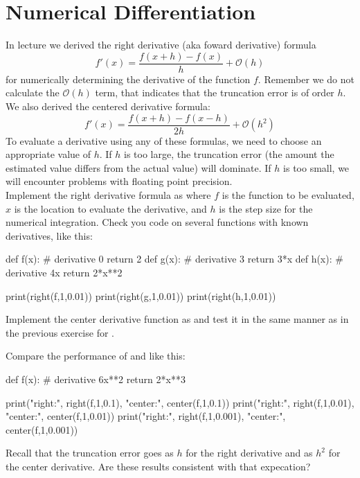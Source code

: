 \section{Numerical Differentiation}

In lecture we derived the right derivative (aka foward derivative) formula
\begin{displaymath}
  f'(x) = \frac{f(x+h) - f(x)}{h} + \mathcal{O}(h)
\end{displaymath}
for numerically determining the derivative of the function $f$.  Remember we do not calculate the 
$\mathcal{O}(h)$ term, that indicates that the truncation error is of order $h$.
We also derived the centered derivative formula:
\begin{displaymath}
f'(x) = \frac{f(x+h) - f(x-h)}{2h} + \mathcal{O}(h^2)
\end{displaymath}
To evaluate a derivative using any of these formulas, we need to
choose an appropriate value of $h$.  If $h$ is too large, the
truncation error (the amount the estimated value differs from the
actual value) will dominate.  If $h$ is too small, we will encounter
problems with floating point precision.\\

\plot Implement the right derivative formula as 
where $f$ is the function to be evaluated, $x$ is the location to
evaluate the derivative, and $h$ is the step size for the numerical
integration.  Check you code on several functions with known
derivatives, like this:
\begin{python}
def f(x):  # derivative 0
    return 2
def g(x):  # derivative 3
    return 3*x
def h(x):  # derivative 4x
    return 2*x**2

print(right(f,1,0.01))
print(right(g,1,0.01))
print(right(h,1,0.01))
\end{python} \vskip 0.25cm


\plot Implement the center derivative function as  and test it in the same manner as in the previous exercise for .\\

\newpage

\plot Compare the performance of  and  like this:
\begin{python}
def f(x):  # derivative 6x**2
    return 2*x**3

print("right:", right(f,1,0.1),   "center:", center(f,1,0.1))
print("right:", right(f,1,0.01),  "center:", center(f,1,0.01)) 
print("right:", right(f,1,0.001), "center:", center(f,1,0.001)) 
\end{python}
Recall that the truncation error goes as $h$ for the right derivative and as $h^2$ for the center derivative.  Are these results consistent with that expecation?\\


